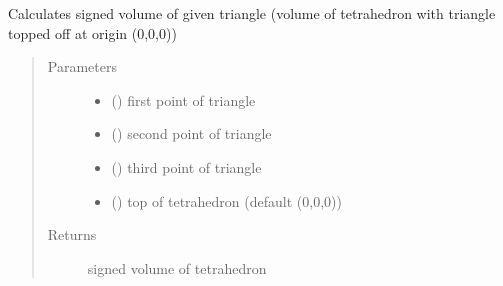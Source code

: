 \documentclass[letterpaper,10pt,english]{sphinxmanual}
\begin{document}
\begin{fulllineitems}
\label{\detokenize{pk_src.misc:pk_src.misc.signedVolumeOfTriangle}}
Calculates signed volume of given triangle (volume of tetrahedron with triangle topped off at origin (0,0,0))
\begin{quote}\begin{description}
\item[{Parameters}] \leavevmode\begin{itemize}
\item {} 
 (\sphinxstyleliteralemphasis{{[}}\sphinxstyleliteralemphasis{,}\sphinxstyleliteralemphasis{,}\sphinxstyleliteralemphasis{{]}}) \textendash{} first point of triangle

\item {} 
 (\sphinxstyleliteralemphasis{{[}}\sphinxstyleliteralemphasis{,}\sphinxstyleliteralemphasis{,}\sphinxstyleliteralemphasis{{]}}) \textendash{} second point of triangle

\item {} 
 (\sphinxstyleliteralemphasis{{[}}\sphinxstyleliteralemphasis{,}\sphinxstyleliteralemphasis{,}\sphinxstyleliteralemphasis{{]}}) \textendash{} third point of triangle

\item {} 
 (\sphinxstyleliteralemphasis{{[}}\sphinxstyleliteralemphasis{,}\sphinxstyleliteralemphasis{,}\sphinxstyleliteralemphasis{{]}}) \textendash{} top of tetrahedron (default (0,0,0))

\end{itemize}

\item[{Returns}] \leavevmode
signed volume of tetrahedron


\end{description}
\end{quote}
\end{fulllineitems}
\end{document}
